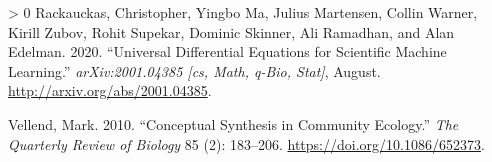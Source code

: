 \documentclass[11pt]{article}
\newlength{\cslhangindent}
\newenvironment{CSLReferences}[3] %
 {%
  \setlength{\parindent}{0pt}
  \ifodd #1 \everypar{\setlength{\hangindent}{\cslhangindent}}\ignorespaces\fi
  \ifnum #2 > 0
  \setlength{\parskip}{#2\baselineskip}
  \fi
 }%
 {}
\begin{document}
\begin{CSLReferences}{1}{0}
\leavevmode\hypertarget{ref-Rackauckas2020UniDif}{}%
Rackauckas, Christopher, Yingbo Ma, Julius Martensen, Collin Warner,
Kirill Zubov, Rohit Supekar, Dominic Skinner, Ali Ramadhan, and Alan
Edelman. 2020. {``Universal Differential Equations for Scientific
Machine Learning.''} \emph{arXiv:2001.04385 {[}cs, Math, q-Bio,
Stat{]}}, August. \url{http://arxiv.org/abs/2001.04385}.

\leavevmode\hypertarget{ref-Vellend2010ConSyn}{}%
Vellend, Mark. 2010. {``Conceptual Synthesis in Community Ecology.''}
\emph{The Quarterly Review of Biology} 85 (2): 183--206.
\url{https://doi.org/10.1086/652373}.

\end{CSLReferences}
\end{document}
